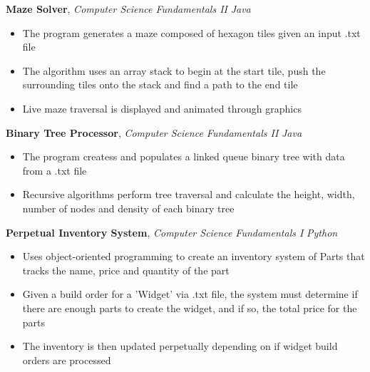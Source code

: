 \documentclass[9pt]{article}
\newenvironment{changemargin}[2]{%
  \begin{list}{}{%
    \setlength{\topsep}{0pt}%
    \setlength{\leftmargin}{#1}%
    \setlength{\rightmargin}{#2}%
    \setlength{\listparindent}{\parindent}%
    \setlength{\itemindent}{\parindent}%
    \setlength{\parsep}{\parskip}%
  }%
  \item[]}{\end{list}
}
\newenvironment{body} {
	\vspace*{-16pt}
	\begin{changemargin}{-0.25in}{-0.5in}
  }	
	{\end{changemargin}
}
\begin{document}
\begin{body}
    \vspace{14pt}
    
    \textbf{Maze Solver}, \emph{Computer Science Fundamentals II} \hfill \emph{Java}\\
    \begin{itemize} \itemsep -0pt  %
        \item The program generates a maze composed of hexagon tiles given an input .txt file 
        \item The algorithm uses an array stack to begin at the start tile, push the surrounding tiles onto the stack and find a path to the end tile 
        \item Live maze traversal is displayed and animated through graphics 
    \end{itemize}

    \textbf{Binary Tree Processor}, \emph{Computer Science Fundamentals II} \hfill \emph{Java}\\
    \begin{itemize} \itemsep -0pt  %
        \item The program createss and populates a linked queue binary tree with data from a .txt file
        \item Recursive algorithms perform tree traversal and calculate the height, width, number of nodes and density of each binary tree
    \end{itemize}

    \textbf{Perpetual Inventory System}, \emph{Computer Science Fundamentals I} \hfill \emph{Python}\\
	\begin{itemize} \itemsep -0pt  %
        \item Uses object-oriented programming to create an inventory system of Parts that tracks the name, price and quantity of the part
        \item Given a build order for a 'Widget' via .txt file, the system must determine if there are enough parts to create the widget, and if so, the total price for the parts
        \item The inventory is then updated perpetually depending on if widget build orders are processed

	\end{itemize}


\end{body}
\end{document}
